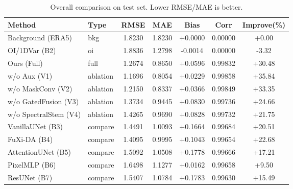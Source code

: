 \begin{table}[t]
\centering
\caption{Overall comparison on test set. Lower RMSE/MAE is better.}
\begin{tabular}{llccccc}
\toprule
Method & Type & RMSE & MAE & Bias & Corr & Improve(\%)\\
\midrule
Background (ERA5) & bkg & 1.8230 & 1.8230 & +0.0000 & 0.00000 & +0.00\\
OI/1DVar (B2) & oi & 1.8836 & 1.2798 & -0.0014 & 0.00000 & -3.32\\
Ours (Full) & full & 1.2674 & 0.8650 & +0.0596 & 0.99832 & +30.48\\
w/o Aux (V1) & ablation & 1.1696 & 0.8054 & +0.0229 & 0.99858 & +35.84\\
w/o MaskConv (V2) & ablation & 1.2150 & 0.8337 & +0.0366 & 0.99849 & +33.35\\
w/o GatedFusion (V3) & ablation & 1.3734 & 0.9445 & +0.0830 & 0.99736 & +24.66\\
w/o SpectralStem (V4) & ablation & 1.4265 & 0.9690 & +0.0828 & 0.99732 & +21.75\\
VanillaUNet (B3) & compare & 1.4491 & 1.0093 & +0.1664 & 0.99684 & +20.51\\
FuXi-DA (B4) & compare & 1.4095 & 0.9995 & +0.1043 & 0.99654 & +22.68\\
AttentionUNet (B5) & compare & 1.5092 & 1.0508 & +0.1778 & 0.99666 & +17.21\\
PixelMLP (B6) & compare & 1.6498 & 1.1277 & +0.0162 & 0.99658 & +9.50\\
ResUNet (B7) & compare & 1.5407 & 1.0784 & +0.1783 & 0.99630 & +15.49\\
\bottomrule
\end{tabular}
\end{table}
